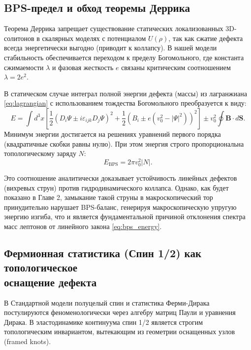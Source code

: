 \documentclass[11pt,a4paper]{article}
\begin{document}
	\subsection{BPS-предел и обход теоремы Деррика}
	Теорема Деррика запрещает существование статических локализованных 3D-солитонов в скалярных моделях с потенциалом $U(\rho)$, так как сжатие дефекта всегда энергетически выгодно (приводит к коллапсу). 
	В нашей модели стабильность обеспечивается переходом к пределу Богомольного, где константа сжимаемости $\lambda$ и фазовая жесткость $e$ связаны критическим соотношением $\lambda = 2e^2$.
	
	В статическом случае интеграл полной энергии дефекта (массы) из лагранжиана \eqref{eq:lagrangian} с использованием тождества Богомольного преобразуется к виду:
	\begin{equation}
		E = \int d^3x \left[ \frac{1}{2} \left( D_i \Psi \pm i \varepsilon_{ijk} D_j \Psi \right)^2 + \frac{1}{2} \left( B_i \pm e(v_0^2 - |\Psi|^2) \right)^2 \right] \pm v_0^2 \oint \mathbf{B} \cdot d\mathbf{S}.
	\end{equation}
	Минимум энергии достигается на решениях уравнений первого порядка (квадратичные скобки равны нулю). При этом энергия строго пропорциональна топологическому заряду $N$:
	\begin{equation}
		E_{\text{BPS}} = 2\pi v_0^2 |N|.
		\label{eq:bps_energy}
	\end{equation}
	
	Это соотношение аналитически доказывает устойчивость линейных дефектов (вихревых струн) против гидродинамического коллапса. Однако, как будет показано в Главе 2, замыкание такой струны в макроскопический тор принудительно нарушает BPS-баланс, генерируя макроскопическую упругую энергию изгиба, что и является фундаментальной причиной отклонения спектра масс лептонов от линейного закона \eqref{eq:bps_energy}.
	
	\subsection{Фермионная статистика (Спин 1/2) как топологическое\\ оснащение дефекта}
	
	В Стандартной модели полуцелый спин и статистика Ферми-Дирака постулируются феноменологически через алгебру матриц Паули и уравнения Дирака. В эластодинамике континуума спин 1/2 является строгим топологическим инвариантом, вытекающим из геометрии оснащенных узлов (framed knots).
	
\end{document}
